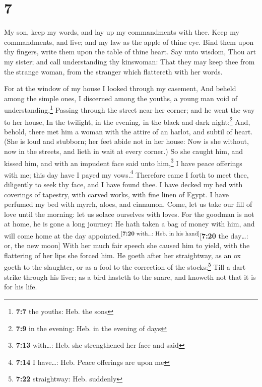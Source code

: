 \hypertarget{section-6}{%
\section{7}\label{section-6}}

 My son, keep my words, and lay up my commandments with
thee.  Keep my commandments, and live; and my law as the
apple of thine eye.  Bind them upon thy fingers, write
them upon the table of thine heart.  Say unto wisdom, Thou
art my sister; and call understanding thy kinswoman:  That
they may keep thee from the strange woman, from the stranger which
flattereth with her words.

 For at the window of my house I looked through my
casement,  And beheld among the simple ones, I discerned
among the youths, a young man void of understanding,\footnote{\textbf{7:7}
  the youths: Heb. the sons}  Passing through the street
near her corner; and he went the way to her house,  In the
twilight, in the evening, in the black and dark night:\footnote{\textbf{7:9}
  in the evening: Heb. in the evening of days}  And,
behold, there met him a woman with the attire of an harlot, and subtil
of heart.  (She is loud and stubborn; her feet abide not
in her house:  Now is she without, now in the streets,
and lieth in wait at every corner.)  So she caught him,
and kissed him, and with an impudent face said unto him,\footnote{\textbf{7:13}
  with\ldots: Heb. she strengthened her face and said}  I
have peace offerings with me; this day have I payed my vows.\footnote{\textbf{7:14}
  I have\ldots: Heb. Peace offerings are upon me} 
Therefore came I forth to meet thee, diligently to seek thy face, and I
have found thee.  I have decked my bed with coverings of
tapestry, with carved works, with fine linen of Egypt.  I
have perfumed my bed with myrrh, aloes, and cinnamon. 
Come, let us take our fill of love until the morning: let us solace
ourselves with loves.  For the goodman is not at home, he
is gone a long journey:  He hath taken a bag of money
with him, and will come home at the day
appointed.\textsuperscript{{[}\textbf{7:20} with\ldots: Heb. in his
hand{]}}{[}\textbf{7:20} the day\ldots: or, the new moon{]}
 With her much fair speech she caused him to yield, with
the flattering of her lips she forced him.  He goeth
after her straightway, as an ox goeth to the slaughter, or as a fool to
the correction of the stocks;\footnote{\textbf{7:22} straightway: Heb.
  suddenly}  Till a dart strike through his liver; as a
bird hasteth to the snare, and knoweth not that it is for his life.

